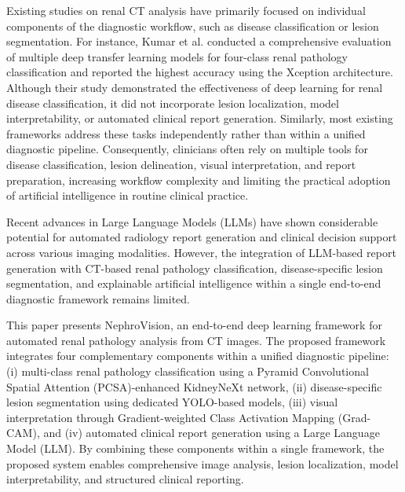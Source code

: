 \documentclass[]{elsarticle}
\begin{document}
Existing studies on renal CT analysis have primarily focused on individual components of the diagnostic workflow, such as disease classification or lesion segmentation. For instance, Kumar et al. \cite{kumar2024comprehensive} conducted a comprehensive evaluation of multiple deep transfer learning models for four-class renal pathology classification and reported the highest accuracy using the Xception architecture. Although their study demonstrated the effectiveness of deep learning for renal disease classification, it did not incorporate lesion localization, model interpretability, or automated clinical report generation. Similarly, most existing frameworks address these tasks independently rather than within a unified diagnostic pipeline. Consequently, clinicians often rely on multiple tools for disease classification, lesion delineation, visual interpretation, and report preparation, increasing workflow complexity and limiting the practical adoption of artificial intelligence in routine clinical practice.

Recent advances in Large Language Models (LLMs) have shown considerable potential for automated radiology report generation \cite{sloan2024automated} and clinical decision support \cite{liu2024bootstrapping} across various imaging modalities. However, the integration of LLM-based report generation with CT-based renal pathology classification, disease-specific lesion segmentation, and explainable artificial intelligence within a single end-to-end diagnostic framework remains limited.

This paper presents NephroVision, an end-to-end deep learning framework for automated renal pathology analysis from CT images. The proposed framework integrates four complementary components within a unified diagnostic pipeline: (i) multi-class renal pathology classification using a Pyramid Convolutional Spatial Attention (PCSA)-enhanced KidneyNeXt network, (ii) disease-specific lesion segmentation using dedicated YOLO-based models, (iii) visual interpretation through Gradient-weighted Class Activation Mapping (Grad-CAM), and (iv) automated clinical report generation using a Large Language Model (LLM). By combining these components within a single framework, the proposed system enables comprehensive image analysis, lesion localization, model interpretability, and structured clinical reporting.
\end{document}
